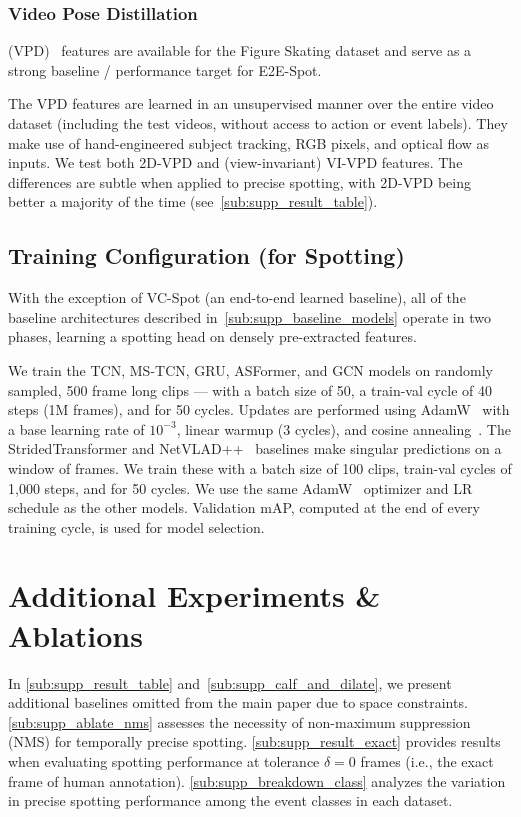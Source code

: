 \documentclass[runningheads]{llncs}
\newcommand{\notation}[1]{\ensuremath{#1}\xspace}
\newcommand{\OURMETHOD}{{E2E-Spot}\xspace}
\newcommand{\Tolerance}{\notation{\delta}}
\begin{document}
\subsubsection*{Video Pose Distillation} (VPD)~\cite{vpd} features are available for the Figure Skating dataset and serve as a strong baseline / performance target for \OURMETHOD.

The VPD features are learned in an unsupervised manner over the entire video dataset (including the test videos, without access to action or event labels).
They make use of hand-engineered subject tracking, RGB pixels, and optical flow as inputs.
We test both 2D-VPD and (view-invariant) VI-VPD features.
The differences are subtle when applied to precise spotting, with 2D-VPD being better a majority of the time (see~\autoref{sub:supp_result_table}).

\subsection{Training Configuration (for Spotting)}

With the exception of VC-Spot (an end-to-end learned baseline), all of the baseline architectures described in~\autoref{sub:supp_baseline_models} operate in two phases, learning a spotting head on densely pre-extracted features.

We train the TCN, MS-TCN, GRU, ASFormer, and GCN models on randomly sampled, 500 frame long clips --- with a batch size of 50, a train-val cycle of 40 steps (1M frames), and for 50 cycles.
Updates are performed using AdamW~\cite{adamw} with a base learning rate of $10^{-3}$, linear warmup (3 cycles), and cosine annealing~\cite{cosinelr}.
The StridedTransformer and NetVLAD++~\cite{netvladpp} baselines make singular predictions on a window of frames.
We train these with a batch size of 100 clips, train-val cycles of 1,000 steps, and for 50 cycles.
We use the same AdamW~\cite{adamw} optimizer and LR schedule as the other models.
Validation mAP, computed at the end of every training cycle, is used for model selection. 
\section{Additional Experiments \& Ablations}
\label{sec:supp_result}

In \autoref{sub:supp_result_table} and~\autoref{sub:supp_calf_and_dilate}, we present additional baselines omitted from the main paper due to space constraints.
\autoref{sub:supp_ablate_nms} assesses the necessity of non-maximum suppression (NMS) for temporally precise spotting.
\autoref{sub:supp_result_exact} provides results when evaluating spotting performance at tolerance $\Tolerance=0$ frames (i.e., the exact frame of human annotation).
\autoref{sub:supp_breakdown_class} analyzes the variation in precise spotting performance among the event classes in each dataset.
\end{document}

